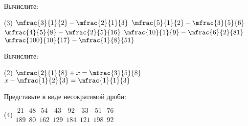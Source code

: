 \begin{homework}[number=1]
	\begin{listofex}
		\item Вычислите:
		\begin{tasks}(3)
			\task \( \mfrac{3}{1}{2}-\mfrac{2}{1}{3} \)
			\task \( \mfrac{5}{1}{2}-\mfrac{3}{5}{6} \)
			\task \( \mfrac{4}{5}{8}-\mfrac{2}{5}{16} \)
			\task \( \mfrac{10}{1}{9}-\mfrac{6}{2}{81} \)
			\task \( \mfrac{100}{10}{17}-\mfrac{1}{8}{51} \)
		\end{tasks}
		\item Вычислите:
		\begin{tasks}(2)
			\task \( \mfrac{2}{1}{8}+x=\mfrac{3}{5}{8} \)
			\task \( x-\mfrac{1}{2}{3}=\mfrac{1}{1}{3} \)
		\end{tasks}
		\item Представьте в виде несократимой дроби:
		\begin{tasks}(4)
			\task \( \dfrac{21}{189} \)
			\task \( \dfrac{48}{80} \)
			\task \( \dfrac{54}{162} \)
			\task \( \dfrac{43}{129} \)
			\task \( \dfrac{92}{184} \)
			\task \( \dfrac{33}{121} \)
			\task \( \dfrac{51}{198} \)
			\task \( \dfrac{76}{92} \)
		\end{tasks}
	\end{listofex}
\end{homework}
%
%
%
%
%
%
%
%
